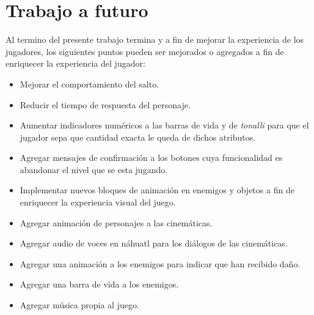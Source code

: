 \section{Trabajo a futuro}
Al termino del presente trabajo termina y a fin de mejorar la experiencia de 
los jugadores, los siguientes puntos pueden ser mejorados o agregados a fin de 
enriquecer la experiencia del jugador:

\begin{itemize}
	\item Mejorar el comportamiento del salto.
	\item Reducir el tiempo de respuesta del personaje.
	\item Aumentar indicadores numéricos a las barras de vida y de \textit{tonalli} 
	para que el jugador sepa que cantidad exacta le queda de dichos atributos.
	\item Agregar mensajes de confirmación a los botones cuya funcionalidad es 
	abandonar el nivel que se esta jugando.
	\item Implementar nuevos bloques de animación en enemigos y objetos a fin de 
	enriquecer la experiencia visual del juego.
	\item Agregar animación de personajes a las cinemáticas. 
	\item Agregar audio de voces en náhuatl para los diálogos de las cinemáticas.
	\item Agregar una animación a los enemigos para indicar que han recibido daño.
	\item Agregar una barra de vida a los enemigos.
	\item Agregar música propia al juego.
\end{itemize}

